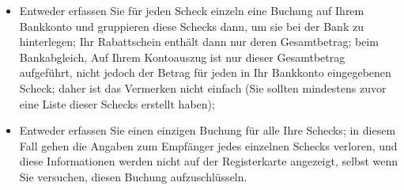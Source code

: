 \begin{itemize}
	\item Entweder erfassen Sie für jeden Scheck einzeln eine Buchung auf Ihrem Bankkonto und gruppieren diese Schecks dann, um sie bei der Bank zu hinterlegen; Ihr Rabattschein enthält dann nur deren Gesamtbetrag; beim Bankabgleich, Auf Ihrem Kontoauszug ist nur dieser Gesamtbetrag aufgeführt, nicht jedoch der Betrag für jeden in Ihr Bankkonto eingegebenen Scheck; daher ist das Vermerken nicht einfach (Sie sollten mindestens zuvor eine Liste dieser Schecks erstellt haben);
	\item Entweder erfassen Sie einen einzigen Buchung für alle Ihre Schecks; in diesem Fall gehen die Angaben zum Empfänger jedes einzelnen Schecks verloren, und diese Informationen werden nicht auf der Registerkarte  angezeigt, selbst wenn Sie versuchen, diesen Buchung aufzuschlüsseln.
\end{itemize} 


